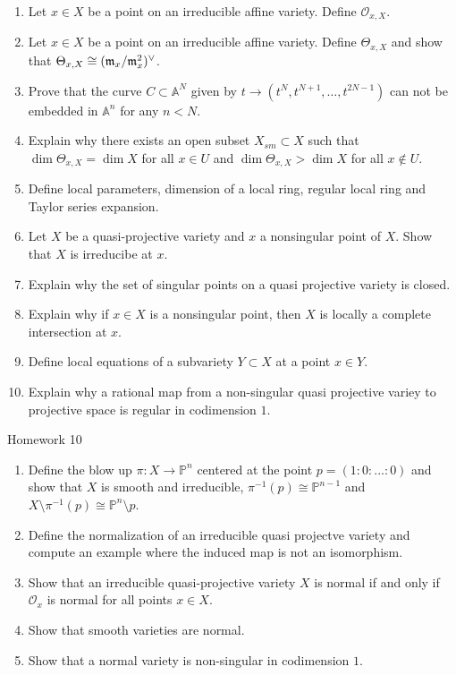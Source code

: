 \documentclass[12pt]{amsart}
\begin{document}
\begin{enumerate}
\item Let  $x\in X$ be a point on an irreducible affine variety. Define $\mathcal O _{x,X}$.
\item Let  $x\in X$ be a point on an irreducible affine variety. Define $\Theta _{x,X}$ and show that $\Theta _{x,X}\cong (\frak m _x/\frak m_x ^2)^\vee$.
\item Prove that the curve $C\subset \mathbb A ^N$ given by $t\to (t^N,t^{N+1},\ldots , t ^{2N-1})$ can not be embedded in $\mathbb A ^n$ for any $n<N$.
\item Explain why there exists an open subset $X_{sm}\subset X$ such that $\dim \Theta _{x,X}=\dim X$ for all $x\in U$ and $\dim  \Theta _{x,X}>\dim X$ for all $x\not \in U$. 
\item Define local parameters, dimension of a local ring, regular local ring and Taylor series expansion.
\item Let $X$ be a quasi-projective variety and $x$ a nonsingular point of $X$. Show that $X$ is irreducibe at $x$.
\item Explain why the set of singular points on a quasi projective variety is closed.
\item Explain why if $x\in X$ is a nonsingular point, then $X$ is locally a complete intersection at $x$.
\item Define local equations of a subvariety $Y\subset X$ at a point $x\in Y$.
\item Explain why a rational map from a non-singular quasi projective variey to projective space is regular in codimension $1$.
\end{enumerate}
\centerline{Homework 10}

\begin{enumerate}
\item 
Define the blow up $\pi:X\to \mathbb P ^n$ centered at the point $p=(1:0:...:0)$ and show that $X$ is smooth and irreducible, $\pi ^{-1}(p)\cong \mathbb P ^{n-1}$ and $X\setminus \pi ^{-1}(p)\cong \mathbb P ^n \setminus p$.

\item Define the normalization of an irreducible quasi projectve variety and compute an example where the induced map is not an isomorphism.

\item Show that an irreducible quasi-projective variety $X$ is normal if and only if $\mathcal O _x$ is normal for all points $x\in X$.

\item Show that smooth varieties are normal.

\item Show that a normal variety is non-singular in codimension $1$.
\end{enumerate}
\end{document}
